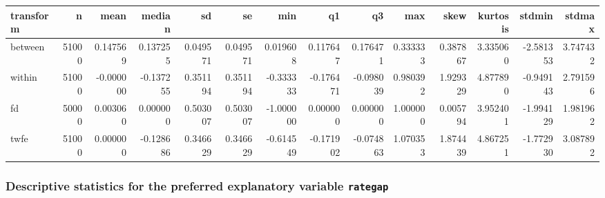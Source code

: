 \documentclass[a4paper,11pt]{article}
\renewcommand{\_}{\textunderscore\allowbreak}
\renewcommand{\arraystretch}{1.25}
\begin{document}
\begin{center}
\begingroup
\scriptsize
\setlength{\tabcolsep}{3pt}
\renewcommand{\arraystretch}{1.22}
\begin{adjustbox}{max width=\textwidth}
\begin{tabular}{@{}lrrrrrrrrrrrrr@{}}
\toprule
transform & n & mean & median & sd & se & min & q1 & q3 & max & skew &
kurtosis & std\_min & std\_max \\
\midrule
between & 51000 & 0.147569 & 0.137255 & 0.049571 & 0.049571 & 0.019608 &
0.117647 & 0.176471 & 0.333333 & 0.387867 & 3.335060 & -2.581353 &
3.747432 \\
within & 51000 & -0.000000 & -0.137255 & 0.351194 & 0.351194 & -0.333333
& -0.176471 & -0.098039 & 0.980392 & 1.929329 & 4.877890 & -0.949143 &
2.791596 \\
fd & 50000 & 0.003060 & 0.000000 & 0.503007 & 0.503007 & -1.000000 &
0.000000 & 0.000000 & 1.000000 & 0.005794 & 3.952401 & -1.994129 &
1.981962 \\
twfe & 51000 & 0.000000 & -0.128686 & 0.346629 & 0.346629 & -0.614549 &
-0.171902 & -0.074863 & 1.070353 & 1.874439 & 4.867251 & -1.772930 &
3.087892 \\
\bottomrule
\end{tabular}
\end{adjustbox}
\endgroup
\end{center}


\hypertarget{descriptive-statistics-for-the-preferred-explanatory-variable-rate_gap}{%
\subsubsection{\texorpdfstring{Descriptive statistics for the preferred
explanatory variable
\texttt{rate\_gap}}{Descriptive statistics for the preferred explanatory variable rate\_gap}}\label{descriptive-statistics-for-the-preferred-explanatory-variable-rate_gap}}
\end{document}
